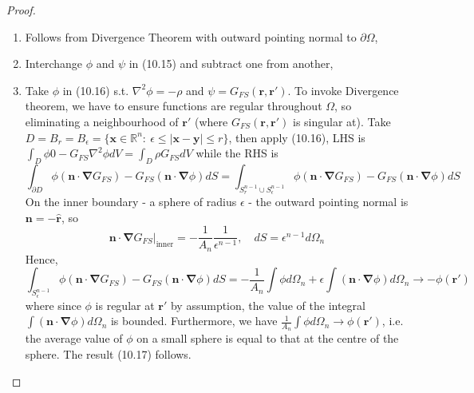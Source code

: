 \documentclass[a4paper]{article}
\begin{document}
\begin{proof}\leavevmode
\begin{enumerate}
    \item Follows from Divergence Theorem with outward pointing normal to $\partial\Omega$,
    \item Interchange $\phi$ and $\psi$ in (10.15) and subtract one from another,
    \item Take $\phi$ in (10.16) s.t. $\nabla^2\phi=-\rho$ and $\psi=G_{FS}(\mathbf{r},\mathbf{r'})$. To invoke Divergence theorem, we have to ensure functions are regular throughout $\Omega$, so eliminating a neighbourhood of $\mathbf{r'}$ (where $G_{FS}(\mathbf{r},\mathbf{r'})$ is singular at). Take $D=B_r=B_\epsilon=\{\mathbf{x}\in\mathbb{R}^n:~\epsilon\leq|\mathbf{x}-\mathbf{y}|\leq r\}$, then apply (10.16), LHS is $\int_D\phi0-G_{FS}\nabla^2\phi dV=\int_D\rho G_{FS}dV$ while the RHS is
    $$\int_{\partial D}\phi(\mathbf{n}\cdot\boldsymbol{\nabla}G_{FS})-G_{FS}(\mathbf{n}\cdot\boldsymbol{\nabla}\phi)dS=\int_{S_r^{n-1}\cup S_\epsilon^{n-1}}\phi(\mathbf{n}\cdot\boldsymbol{\nabla}G_{FS})-G_{FS}(\mathbf{n}\cdot\boldsymbol{\nabla}\phi)dS$$
    On the inner boundary - a sphere of radius $\epsilon$ - the outward pointing normal is $\mathbf{n}=-\mathbf{\hat{r}}$, so $$\mathbf{n}\cdot\boldsymbol{\nabla}G_{FS}|_{\text{inner}}=-\frac{1}{A_n}\frac{1}{\epsilon^{n-1}},\quad dS=\epsilon^{n-1}d\Omega_n$$
    Hence,
    $$\int_{S_\epsilon^{n-1}}\phi(\mathbf{n}\cdot\boldsymbol{\nabla}G_{FS})-G_{FS}(\mathbf{n}\cdot\boldsymbol{\nabla}\phi)dS=-\frac{1}{A_n}\int\phi d\Omega_n+\epsilon\int(\mathbf{n}\cdot\boldsymbol{\nabla}\phi)d\Omega_n\rightarrow-\phi(\mathbf{r'})$$
    where since $\phi$ is regular at $\mathbf{r'}$ by assumption, the value of the integral $\int(\mathbf{n}\cdot\boldsymbol{\nabla}\phi)d\Omega_n$ is bounded. Furthermore, we have $\frac{1}{A_n}\int\phi d\Omega_n\rightarrow\phi(\mathbf{r'})$, i.e. the average value of $\phi$ on a small sphere is equal to that at the centre of the sphere. The result (10.17) follows.
    \end{enumerate}
\end{proof}
\end{document}
